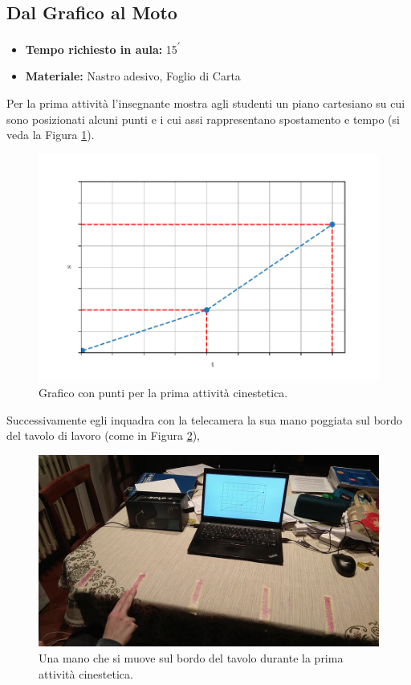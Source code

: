 \documentclass{report} \usepackage[T1]{fontenc} \usepackage[italian]{babel}
\begin{document}
\subsection{Dal Grafico al Moto}

\begin{itemize}
\item \textbf{Tempo richiesto in aula:} 15\textsuperscript{$\prime$}
\item \textbf{Materiale:} Nastro adesivo, Foglio di Carta
\end{itemize}

Per la prima attività l’insegnante mostra agli studenti un piano cartesiano su
cui sono posizionati alcuni punti e i cui assi rappresentano spostamento e
tempo (si veda la Figura \ref{fig:kine_plot1}).
\begin{figure}[ht]
\centering
  \includegraphics[width=\textwidth]{kine_plot1}
  \caption{Grafico con punti per la prima attività
           cinestetica.}
  \label{fig:kine_plot1}
\end{figure}
Successivamente egli inquadra con la telecamera la sua mano
poggiata sul bordo del tavolo di lavoro (come in  Figura \ref{fig:kine_hand}),
\begin{figure}[H]
\centering
  \includegraphics[width=\textwidth]{kine_hand}
  \caption{Una mano che si muove sul bordo del tavolo durante la
           prima attività cinestetica.}
  \label{fig:kine_hand}
\end{figure}
\end{document}
